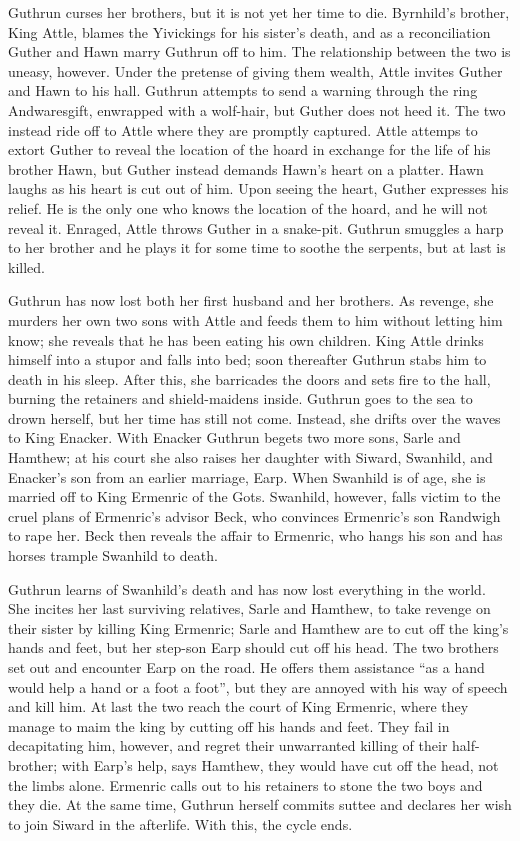 Guthrun curses her brothers, but it is not yet her time to die.  Byrnhild’s brother, King Attle, blames the Yivickings for his sister’s death, and as a reconciliation Guther and Hawn marry Guthrun off to him.  The relationship between the two is uneasy, however.  Under the pretense of giving them wealth, Attle invites Guther and Hawn to his hall.  Guthrun attempts to send a warning through the ring Andwaresgift, enwrapped with a wolf-hair, but Guther does not heed it.  The two instead ride off to Attle where they are promptly captured.  Attle attemps to extort Guther to reveal the location of the hoard in exchange for the life of his brother Hawn, but Guther instead demands Hawn’s heart on a platter.  Hawn laughs as his heart is cut out of him.  Upon seeing the heart, Guther expresses his relief.  He is the only one who knows the location of the hoard, and he will not reveal it.  Enraged, Attle throws Guther in a snake-pit.  Guthrun smuggles a harp to her brother and he plays it for some time to soothe the serpents, but at last is killed.

Guthrun has now lost both her first husband and her brothers.  As revenge, she murders her own two sons with Attle and feeds them to him without letting him know; she reveals that he has been eating his own children.  King Attle drinks himself into a stupor and falls into bed; soon thereafter Guthrun stabs him to death in his sleep.  After this, she barricades the doors and sets fire to the hall, burning the retainers and shield-maidens inside.  Guthrun goes to the sea to drown herself, but her time has still not come.  Instead, she drifts over the waves to King Enacker.  With Enacker Guthrun begets two more sons, Sarle and Hamthew; at his court she also raises her daughter with Siward, Swanhild, and Enacker’s son from an earlier marriage, Earp.  When Swanhild is of age, she is married off to King Ermenric of the Gots.  Swanhild, however, falls victim to the cruel plans of Ermenric’s advisor Beck, who convinces Ermenric’s son Randwigh to rape her.  Beck then reveals the affair to Ermenric, who hangs his son and has horses trample Swanhild to death.

Guthrun learns of Swanhild’s death and has now lost everything in the world.  She incites her last surviving relatives, Sarle and Hamthew, to take revenge on their sister by killing King Ermenric; Sarle and Hamthew are to cut off the king’s hands and feet, but her step-son Earp should cut off his head.  The two brothers set out and encounter Earp on the road.  He offers them assistance “as a hand would help a hand or a foot a foot”, but they are annoyed with his way of speech and kill him.  At last the two reach the court of King Ermenric, where they manage to maim the king by cutting off his hands and feet.  They fail in decapitating him, however, and regret their unwarranted killing of their half-brother; with Earp’s help, says Hamthew, they would have cut off the head, not the limbs alone.  Ermenric calls out to his retainers to stone the two boys and they die.  At the same time, Guthrun herself commits suttee and declares her wish to join Siward in the afterlife.  With this, the cycle ends.

